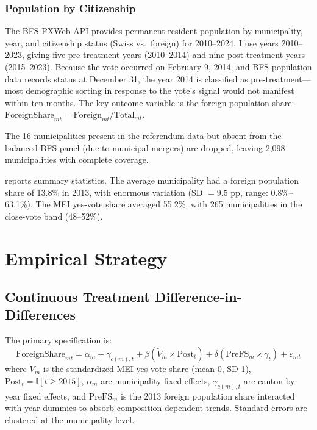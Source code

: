 \documentclass[12pt]{article}
\newcommand{\ind}{\mathbb{I}}
\begin{document}
\subsubsection*{Population by Citizenship} The BFS PXWeb API provides permanent resident population by municipality, year, and citizenship status (Swiss vs.\ foreign) for 2010--2024. I use years 2010--2023, giving five pre-treatment years (2010--2014) and nine post-treatment years (2015--2023). Because the vote occurred on February 9, 2014, and BFS population data records status at December 31, the year 2014 is classified as pre-treatment---most demographic sorting in response to the vote's signal would not manifest within ten months. The key outcome variable is the foreign population share: $\text{ForeignShare}_{mt} = \text{Foreign}_{mt} / \text{Total}_{mt}$.

The 16 municipalities present in the referendum data but absent from the balanced BFS panel (due to municipal mergers) are dropped, leaving 2,098 municipalities with complete coverage.

 reports summary statistics. The average municipality had a foreign population share of 13.8\% in 2013, with enormous variation (SD $= 9.5$ pp, range: 0.8\%--63.1\%). The MEI yes-vote share averaged 55.2\%, with 265 municipalities in the close-vote band (48--52\%).



\section{Empirical Strategy}

\subsection{Continuous Treatment Difference-in-Differences}

The primary specification is:
\begin{equation}
\text{ForeignShare}_{mt} = \alpha_m + \gamma_{c(m),t} + \beta \left( \widetilde{V}_m \times \text{Post}_t \right) + \delta \left( \text{PreFS}_m \times \gamma_t \right) + \varepsilon_{mt}
\label{eq:main}
\end{equation}
where $\widetilde{V}_m$ is the standardized MEI yes-vote share (mean 0, SD 1), $\text{Post}_t = \ind[t \geq 2015]$, $\alpha_m$ are municipality fixed effects, $\gamma_{c(m),t}$ are canton-by-year fixed effects, and $\text{PreFS}_m$ is the 2013 foreign population share interacted with year dummies to absorb composition-dependent trends. Standard errors are clustered at the municipality level.
\end{document}
